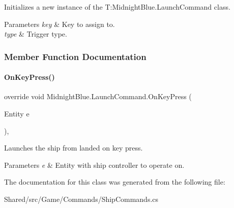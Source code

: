 Initializes a new instance of the T\+:\+Midnight\+Blue.\+Launch\+Command class. 


\begin{DoxyParams}{Parameters}
{\em key} & Key to assign to.\\
\hline
{\em type} & Trigger type.\\
\hline
\end{DoxyParams}


\subsubsection{Member Function Documentation}
\hypertarget{class_midnight_blue_1_1_launch_command_a5da2fdd898111ea59f4f63126c380a3e}{}\label{class_midnight_blue_1_1_launch_command_a5da2fdd898111ea59f4f63126c380a3e} 
\paragraph{\texorpdfstring{On\+Key\+Press()}{OnKeyPress()}}
{\footnotesize\ttfamily override void Midnight\+Blue.\+Launch\+Command.\+On\+Key\+Press (\begin{DoxyParamCaption}\item[{Entity}]{e }\end{DoxyParamCaption})\hspace{0.3cm}{\ttfamily [inline]}, {\ttfamily [protected]}}



Launches the ship from landed on key press. 


\begin{DoxyParams}{Parameters}
{\em e} & Entity with ship controller to operate on.\\
\hline
\end{DoxyParams}


The documentation for this class was generated from the following file\+:\begin{DoxyCompactItemize}
\item 
Shared/src/\+Game/\+Commands/Ship\+Commands.\+cs\end{DoxyCompactItemize}

